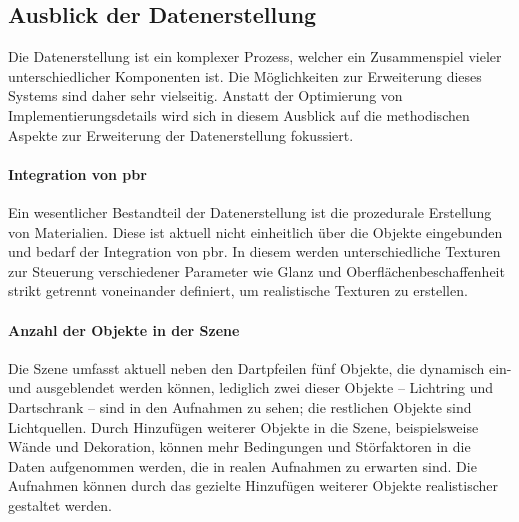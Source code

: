 
\vspace*{-0.15cm}
\subsection{Ausblick der Datenerstellung}
\label{sec:ausblick_data}

Die Datenerstellung ist ein komplexer Prozess, welcher ein Zusammenspiel vieler unterschiedlicher Komponenten ist. Die Möglichkeiten zur Erweiterung dieses Systems sind daher sehr vielseitig. Anstatt der Optimierung von Implementierungsdetails wird sich in diesem Ausblick auf die methodischen Aspekte zur Erweiterung der Datenerstellung fokussiert.

\vspace*{-0.15cm}
\paragraph{Integration von \ac{pbr}}

Ein wesentlicher Bestandteil der Datenerstellung ist die prozedurale Erstellung von Materialien. Diese ist aktuell nicht einheitlich über die Objekte eingebunden und bedarf der Integration von \ac{pbr}. In diesem werden unterschiedliche Texturen zur Steuerung verschiedener Parameter wie Glanz und Oberflächenbeschaffenheit strikt getrennt voneinander definiert, um realistische Texturen zu erstellen.


\vspace*{-0.15cm}
\paragraph{Anzahl der Objekte in der Szene}

Die Szene umfasst aktuell neben den Dartpfeilen fünf Objekte, die dynamisch ein- und ausgeblendet werden können, lediglich zwei dieser Objekte -- Lichtring und Dartschrank -- sind in den Aufnahmen zu sehen; die restlichen Objekte sind Lichtquellen. Durch Hinzufügen weiterer Objekte in die Szene, beispielsweise Wände und Dekoration, können mehr Bedingungen und Störfaktoren in die Daten aufgenommen werden, die in realen Aufnahmen zu erwarten sind. Die Aufnahmen können durch das gezielte Hinzufügen weiterer Objekte realistischer gestaltet werden.



